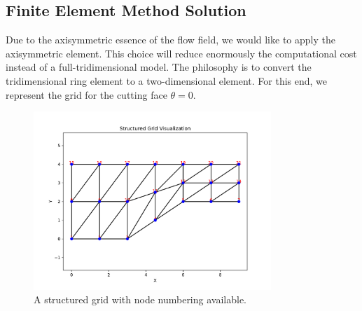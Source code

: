 \documentclass[12pt]{book}
\theoremstyle{bfnote}
\theoremstyle{bfnote}
\begin{document}
\subsection{Finite Element Method Solution} %
\label{subsec:Finite_Element_Method_Solution}
Due to the axisymmetric essence of the flow field, we would like to apply the axisymmetric element. This choice will reduce enormously the computational cost instead of a full-tridimensional model. The philosophy is to convert the tridimensional ring element to a two-dimensional element. For this end, we represent the grid for the cutting face $\theta = 0$.

\begin{figure}[h!]
    \centering
    \includegraphics[width=0.8\textwidth, height=0.6\textheight, keepaspectratio]{triangular_grid.pdf}
    \caption{A structured grid with node numbering available.}
    \label{fig:structured_grid}
\end{figure}
\end{document}
